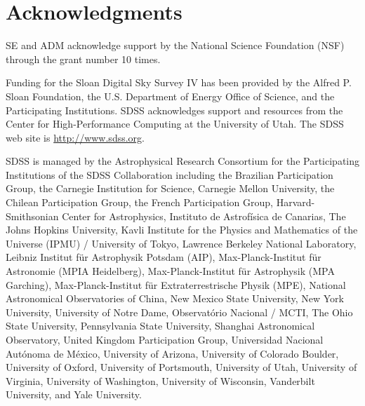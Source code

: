 \documentclass[useAMS,usenatbib]{mn2e}
\begin{document}
\section*{Acknowledgments}
SE and ADM acknowledge support by the National Science Foundation (NSF) through the 
grant number 10 times. 

Funding for the Sloan Digital Sky Survey IV has been provided by the Alfred P. 
Sloan Foundation, the U.S. Department of Energy Office of Science, and the 
Participating Institutions. SDSS acknowledges support and resources from the 
Center for High-Performance Computing at the University of Utah. The SDSS web 
site is \url{http://www.sdss.org}.

SDSS is managed by the Astrophysical Research Consortium for the Participating 
Institutions of the SDSS Collaboration including the Brazilian Participation 
Group, the Carnegie Institution for Science, Carnegie Mellon University, the 
Chilean Participation Group, the French Participation Group, Harvard-Smithsonian 
Center for Astrophysics, Instituto de Astrof\'{i}sica de Canarias, The Johns 
Hopkins University, Kavli Institute for the Physics and Mathematics of the 
Universe (IPMU) / University of Tokyo, Lawrence Berkeley National Laboratory, 
Leibniz Institut f\"{u}r Astrophysik Potsdam (AIP), Max-Planck-Institut f\"{u}r 
Astronomie (MPIA Heidelberg), Max-Planck-Institut f\"{u}r Astrophysik (MPA 
Garching), Max-Planck-Institut für Extraterrestrische Physik (MPE), National 
Astronomical Observatories of China, New Mexico State University, New York 
University, University of Notre Dame, Observatório Nacional / MCTI, The Ohio 
State University, Pennsylvania State University, Shanghai Astronomical 
Observatory, United Kingdom Participation Group, Universidad Nacional 
Aut\'{o}noma de M\'{e}xico, University of Arizona, University of Colorado 
Boulder, University of Oxford, University of Portsmouth, University of Utah, 
University of Virginia, University of Washington, University of Wisconsin, 
Vanderbilt University, and Yale University.
\newpage


\end{document}
